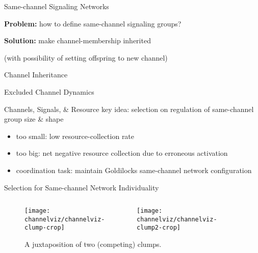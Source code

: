 \begin{frame}{Same-channel Signaling Networks}

\Large
\textbf{Problem:} how to define same-channel signaling groups?

\pause

\textbf{Solution:} make channel-membership inherited

\normalsize
(with possibility of setting offspring to new channel)

\end{frame}

\begin{frame}{Channel Inheritance}
  \vspace{8ex}
  
\end{frame}

\begin{frame}{Excluded Channel Dynamics}
  \vspace{6.6ex}
  
\end{frame}

\begin{frame}{Channels, Signals, \& Resource}
key idea: selection on regulation of same-channel group size \& shape
\pause
\begin{itemize}[<+->]
  \item too small: low resource-collection rate
  \item too big: net negative resource collection due to erroneous activation
  \item coordination task: maintain Goldilocks same-channel network configuration
\end{itemize}

\end{frame}

\begin{frame}{Selection for Same-channel Network Individuality}


\vspace{6ex}

\begin{figure}
\begin{columns}
\begin{column}{0.5\textwidth}
  \centering
  \texttt{[image: channelviz/channelviz-clump-crop]}
\end{column}
\begin{column}{0.5\textwidth}
  \centering
  \texttt{[image: channelviz/channelviz-clump2-crop]}
\end{column}
\end{columns}
\caption{A juxtaposition of two (competing) clumps.}
\end{figure}

\end{frame}
